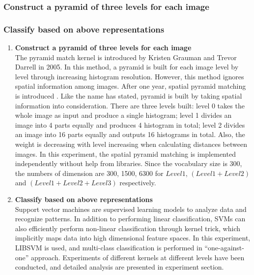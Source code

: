 \subsubsection{Construct a pyramid of three levels for each image}







\subsubsection{Classify based on above representations}


\begin{enumerate}

	\item {\bfseries Construct a pyramid of three levels for each image}
  \\The pyramid match kernel is introduced by Kristen Grauman and Trevor Darrell \cite{grauman2005pyramid} in 2005. In this method, a pyramid is built for each image level by level through increasing histogram resolution. However, this method ignores spatial information among images. After one year, spatial pyramid matching is introduced \cite{lazebnik2006beyond}. Like the name has stated, pyramid is built by taking spatial information into consideration. There are three levels built: level 0 takes the whole image as input and produce a single histogram; level 1 divides an image into 4 parts equally and produces 4 histogram in total; level 2 divides an image into 16 parts equally and outputs 16 histograms in total. Also, the weight is decreasing with level increasing when calculating distances between images. In this experiment, the spatial pyramid matching is implemented independently without help from libraries. Since the vocabulary size is 300, the numbers of dimension are 300, 1500, 6300 for $Level 1$, $(Level 1 + Level 2)$ and $(Level 1 + Level 2 + Level 3)$ respectively.

	\item {\bfseries Classify based on above representations} 
  \\Support vector machines are supervised learning models to analyze data and recognize patterns. In addition to performing linear classification, SVMs can also efficiently perform non-linear classification through kernel trick, which implicitly maps data into high dimensional feature spaces. In this experiment, LIBSVM \cite{CC01a} is used, and multi-class classification is performed in ``one-against-one'' approach. Experiments of different kernels at different levels have been conducted, and detailed analysis are presented in experiment section.
\end{enumerate}

